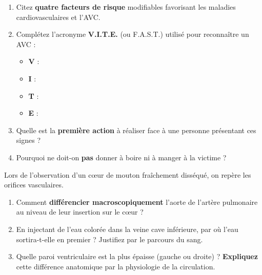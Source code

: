 \documentclass[11pt]{article}
\begin{document}
\begin{exercice}
\begin{enumerate}
    \item Citez \textbf{quatre facteurs de risque} modifiables favorisant les maladies cardiovasculaires et l'AVC.
    \item Complétez l'acronyme \textbf{V.I.T.E.} (ou F.A.S.T.) utilisé pour reconnaître un AVC :
    \begin{itemize}
        \item \textbf{V} : \dotfill
        \item \textbf{I} : \dotfill
        \item \textbf{T} : \dotfill
        \item \textbf{E} : \dotfill
    \end{itemize}
    \item Quelle est la \textbf{première action} à réaliser face à une personne présentant ces signes ?
    \item Pourquoi ne doit-on \textbf{pas} donner à boire ni à manger à la victime ?
\end{enumerate}
\end{exercice}

\begin{exercice}
Lors de l'observation d'un cœur de mouton fraîchement disséqué, on repère les orifices vasculaires.
\begin{enumerate}
    \item Comment \textbf{différencier macroscopiquement} l'aorte de l'artère pulmonaire au niveau de leur insertion sur le cœur ?
    \item En injectant de l'eau colorée dans la veine cave inférieure, par où l'eau sortira-t-elle en premier ? Justifiez par le parcours du sang.
    \item Quelle paroi ventriculaire est la plus épaisse (gauche ou droite) ? \textbf{Expliquez} cette différence anatomique par la physiologie de la circulation.
\end{enumerate}
\end{exercice}
\end{document}
